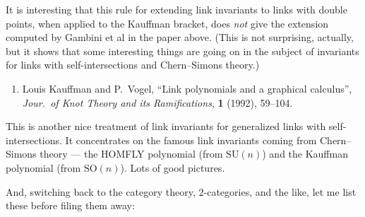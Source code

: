 \documentclass{article}
\def\tightlist{}
\renewcommand{\texttt}[1]{%
  \begingroup
  \ttfamily
  \begingroup\lccode`~=`/\lowercase{\endgroup\def~}{/\discretionary{}{}{}}%
  \begingroup\lccode`~=`[\lowercase{\endgroup\def~}{[\discretionary{}{}{}}%
  \begingroup\lccode`~=`.\lowercase{\endgroup\def~}{.\discretionary{}{}{}}%
  \catcode`/=\active\catcode`[=\active\catcode`.=\active
  \scantokens{#1\noexpand}%
  \endgroup
}
\begin{document}
It is interesting that this rule for extending link invariants to links
with double points, when applied to the Kauffman bracket, does
\emph{not} give the extension computed by Gambini et al in the paper
above. (This is not surprising, actually, but it shows that some
interesting things are going on in the subject of invariants for links
with self-intersections and Chern--Simons theory.)

\begin{enumerate}
\def\labelenumi{\arabic{enumi})}
\setcounter{enumi}{2}
\tightlist
\item
  Louis Kauffman and
  P.\ Vogel, ``Link polynomials and a graphical calculus'', \emph{Jour.\ of Knot Theory and its Ramifications},
  \textbf{1} (1992), 59--104.
\end{enumerate}

This is another nice treatment of link invariants for generalized links
with self-intersections. It concentrates on the famous link invariants
coming from Chern--Simons theory --- the HOMFLY polynomial (from
\(\mathrm{SU}(n)\)) and the Kauffman polynomial (from
\(\mathrm{SO}(n)\)). Lots of good pictures.

And, switching back to the category theory, \(2\)-categories, and the
like, let me list these before filing them away:

\end{document}
